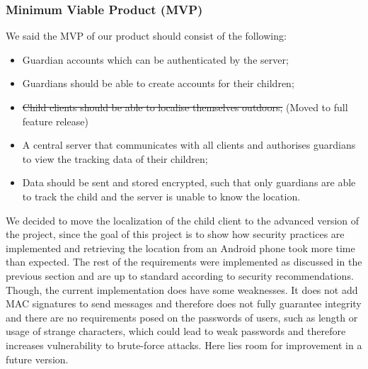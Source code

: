 \documentclass[a4paper]{article}
\begin{document}
\subsubsection{Minimum Viable Product (MVP)}
We said the MVP of our product should consist of the following:
\begin{itemize}
    \item Guardian accounts which can be authenticated by the server;
    \item Guardians should be able to create accounts for their children;
    \item \sout{Child clients should be able to localise themselves outdoors;} (Moved to full feature release)
    \item A central server that communicates with all clients and authorises guardians to view the tracking data of their children;
    \item Data should be sent and stored encrypted, such that only guardians are able to track the child and the server is unable to know the location.
\end{itemize}
We decided to move the localization of the child client to the advanced version of the project, since the goal of this project is to show how security practices are implemented and retrieving the location from an Android phone took more time than expected. The rest of the requirements were implemented as discussed in the previous section and are up to standard according to security recommendations. Though, the current implementation does have some weaknesses. It does not add MAC signatures to send messages and therefore does not fully guarantee integrity and there are no requirements posed on the passwords of users, such as length or usage of strange characters, which could lead to weak passwords and therefore increases vulnerability to brute-force attacks. Here lies room for improvement in a future version.
\end{document}
